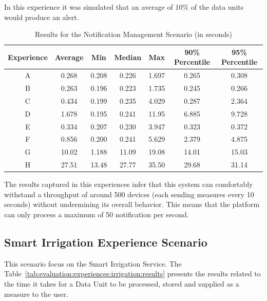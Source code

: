 In this experience it was simulated that an average of 10\% of the data units would produce an alert.

\begin{table}[H]
    \caption{Results for the Notification Management Scenario (in seconds)}
    \label{tab:evaluation:experiences:notification:results}
    \centering
    \begin{tabular}{@{}ccccccc@{}}
    \toprule
    \textbf{Experience} & \textbf{Average} & \textbf{Min} & \textbf{Median} & \textbf{Max} & \textbf{90\% Percentile} & \textbf{95\% Percentile} \\ \midrule
    A & 0.268 & 0.208 & 0.226 & 1.697 & 0.265 & 0.308 \\ \midrule
    B & 0.263 & 0.196 & 0.223 & 1.735 & 0.245 & 0.266 \\ \midrule
    C & 0.434 & 0.199 & 0.235 & 4.029 & 0.287 & 2.364 \\ \midrule
    D & 1.678 & 0.195 & 0.241 & 11.95 & 6.885 & 9.728 \\ \midrule
    E & 0.334 & 0.207 & 0.230 & 3.947 & 0.323 & 0.372 \\ \midrule
    F & 0.856 & 0.200 & 0.241 & 5.629 & 2.379 & 4.875 \\ \midrule
    G & 10.02 & 1.188 & 11.09 & 19.08 & 14.01 & 15.03 \\ \midrule
    H & 27.51 & 13.48 & 27.77 & 35.50 & 29.68 & 31.14 \\ \bottomrule
    \end{tabular}
\end{table}

The results captured in this experiences infer that this system can comfortably withstand a throughput of around 500 devices (each sending measures every 10 seconds) without undermining its overall behavior. This means that the platform can only process a maximum of 50 notification per second. 

\subsection{Smart Irrigation Experience Scenario}
\label{subsec:evaluation:experiences:irrigation}

This scenario focus on the Smart Irrigation Service. The Table~\ref{tab:evaluation:experiences:irrigation:results} presents the results related to the time it takes for a Data Unit to be processed, stored and supplied as a measure to the user.

